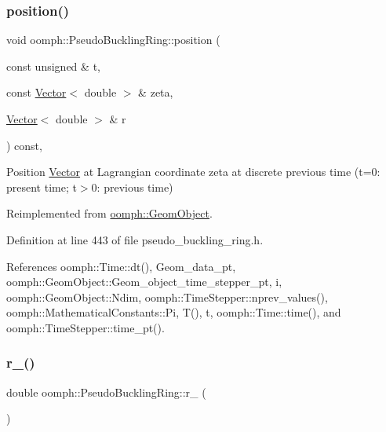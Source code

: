 \subsubsection{\texorpdfstring{position()}{position()}\hspace{0.1cm}{\footnotesize\ttfamily [2/2]}}
{\footnotesize\ttfamily void oomph\+::\+Pseudo\+Buckling\+Ring\+::position (\begin{DoxyParamCaption}\item[{const unsigned \&}]{t,  }\item[{const \hyperlink{classoomph_1_1Vector}{Vector}$<$ double $>$ \&}]{zeta,  }\item[{\hyperlink{classoomph_1_1Vector}{Vector}$<$ double $>$ \&}]{r }\end{DoxyParamCaption}) const\hspace{0.3cm}{\ttfamily [inline]}, {\ttfamily [virtual]}}



Position \hyperlink{classoomph_1_1Vector}{Vector} at Lagrangian coordinate zeta at discrete previous time (t=0\+: present time; t$>$0\+: previous time) 



Reimplemented from \hyperlink{classoomph_1_1GeomObject_ad44a736d23dcd63af163a7d80b5c4dfa}{oomph\+::\+Geom\+Object}.



Definition at line 443 of file pseudo\+\_\+buckling\+\_\+ring.\+h.



References oomph\+::\+Time\+::dt(), Geom\+\_\+data\+\_\+pt, oomph\+::\+Geom\+Object\+::\+Geom\+\_\+object\+\_\+time\+\_\+stepper\+\_\+pt, i, oomph\+::\+Geom\+Object\+::\+Ndim, oomph\+::\+Time\+Stepper\+::nprev\+\_\+values(), oomph\+::\+Mathematical\+Constants\+::\+Pi, T(), t, oomph\+::\+Time\+::time(), and oomph\+::\+Time\+Stepper\+::time\+\_\+pt().

\mbox{\label{classoomph_1_1PseudoBucklingRing_ad202df097c0a68d93a5b2f99abf4c39b}} 
\subsubsection{\texorpdfstring{r\+\_()}{r\_0()}}
{\footnotesize\ttfamily double oomph\+::\+Pseudo\+Buckling\+Ring\+::r\+\_ (\begin{DoxyParamCaption}{ }\end{DoxyParamCaption})\hspace{0.3cm}{\ttfamily [inline]}}



